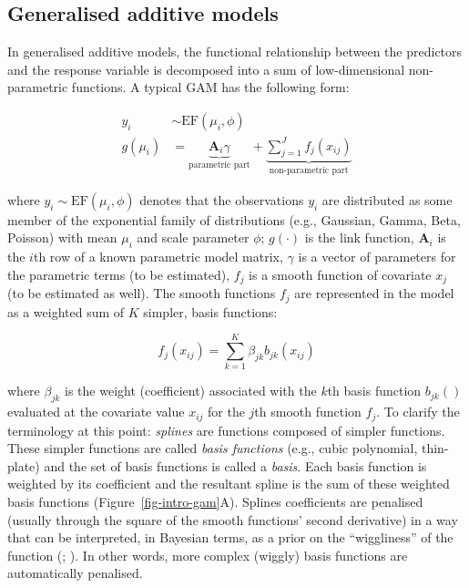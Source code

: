 \documentclass[
  doc,
  floatsintext,
  longtable,
  a4paper,
  nolmodern,
  notxfonts,
  notimes,
  colorlinks=true,linkcolor=blue,citecolor=blue,urlcolor=blue]{apa7}
\begin{document}
\subsection{Generalised additive
models}\label{generalised-additive-models}

In generalised additive models, the functional relationship between the
predictors and the response variable is decomposed into a sum of
low-dimensional non-parametric functions. A typical GAM has the
following form:

\[
\begin{aligned} 
y_{i} &\sim \mathrm{EF}\left(\mu_{i}, \phi\right)\\
g\left(\mu_i\right) &= \underbrace{\mathbf{A}_{i} \gamma}_{\text{parametric part}} + \underbrace{\sum_{j=1}^{J} f_{j}\left(x_{ij}\right)}_{\text{non-parametric part}}
\end{aligned}
\]

where \(y_{i} \sim \mathrm{EF}\left(\mu_{i}, \phi\right)\) denotes that
the observations \(y_{i}\) are distributed as some member of the
exponential family of distributions (e.g., Gaussian, Gamma, Beta,
Poisson) with mean \(\mu_{i}\) and scale parameter \(\phi\);
\(g(\cdot)\) is the link function, \(\mathbf{A}_{i}\) is the \(i\)th row
of a known parametric model matrix, \(\gamma\) is a vector of parameters
for the parametric terms (to be estimated), \(f_{j}\) is a smooth
function of covariate \(x_{j}\) (to be estimated as well). The smooth
functions \(f_{j}\) are represented in the model as a weighted sum of
\(K\) simpler, basis functions:

\[
f_{j}\left(x_{i j}\right) = \sum_{k=1}^K \beta_{jk} b_{jk}\left(x_{ij}\right)
\]

where \(\beta_{jk}\) is the weight (coefficient) associated with the
\(k\)th basis function \(b_{jk}()\) evaluated at the covariate value
\(x_{ij}\) for the \(j\)th smooth function \(f_{j}\). To clarify the
terminology at this point: \emph{splines} are functions composed of
simpler functions. These simpler functions are called \emph{basis
functions} (e.g., cubic polynomial, thin-plate) and the set of basis
functions is called a \emph{basis}. Each basis function is weighted by
its coefficient and the resultant spline is the sum of these weighted
basis functions (Figure~\ref{fig-intro-gam}\ignorespaces A). Splines
coefficients are penalised (usually through the square of the smooth
functions' second derivative) in a way that can be interpreted, in
Bayesian terms, as a prior on the ``wiggliness'' of the function
(; ). In other words, more complex (wiggly) basis functions are
automatically penalised.
\end{document}
